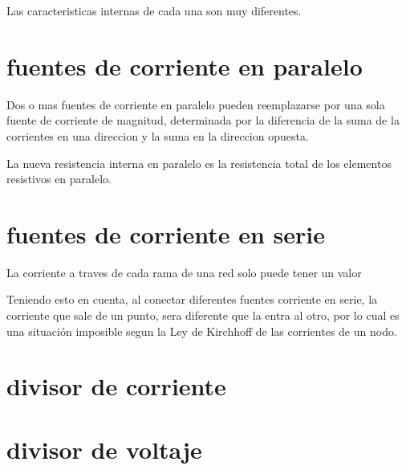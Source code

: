 Las caracteristicas internas de cada una son muy diferentes.

\section*{fuentes de corriente en paralelo}
\justifying
Dos o mas fuentes de corriente en paralelo pueden reemplazarse por una sola fuente de corriente de magnitud, determinada por la diferencia de la suma de la corrientes en una direccion y la suma en la direccion opuesta.

La nueva resistencia interna en paralelo es la resistencia total de los elementos resistivos en paralelo.
\section*{fuentes de corriente en serie}
\justifying
La corriente a traves de cada rama de una red solo puede tener un valor

Teniendo esto en cuenta, al conectar diferentes fuentes corriente en serie, la corriente que sale de un punto, sera diferente que la entra al otro, por lo cual es una situación imposible segun la Ley de Kirchhoff de las corrientes de un nodo.
\section*{divisor de corriente}
\section*{divisor de voltaje}